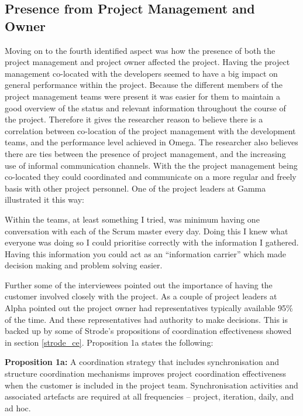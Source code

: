 \subsection{Presence from Project Management and Owner}

Moving on to the fourth identified aspect was how the presence of both the project management and project owner affected the project. Having the project management co-located with the developers seemed to have a big impact on general performance within the project. Because the different members of the project management teams were present it was easier for them to maintain a good overview of the status and relevant information throughout the course of the project. Therefore it gives the researcher reason to believe there is a correlation between co-location of the project management with the development teams, and the performance level achieved in Omega. The researcher also believes there are ties between the presence of project management, and the increasing use of informal communication channels. With the the project management being co-located they could coordinated and communicate on a more regular and freely basis with other project personnel. One of the project leaders at Gamma illustrated it this way:

\begin{fancyquotes}
Within the teams, at least something I tried, was minimum having one conversation with each of the Scrum master every day. Doing this I knew what everyone was doing so I could prioritise correctly with the information I gathered. Having this information you could act as an ``information carrier'' which made decision making and problem solving easier.
\end{fancyquotes}

Further some of the interviewees pointed out the importance of having the customer involved closely with the project. As a couple of project leaders at Alpha pointed out the project owner had representatives typically available 95\% of the time. And these representatives had authority to make decisions. This is backed up by some of Strode's \cite{Strode2012} propositions of coordination effectiveness showed in section \ref{strode_ce}. Proposition 1a states the following:

\begin{fancyquotes}
\textbf{Proposition 1a:} A coordination strategy that includes synchronisation and structure coordination mechanisms improves project coordination effectiveness when the customer is included in the project team. Synchronisation activities and associated artefacts are required at all frequencies – project, iteration, daily, and ad hoc.
\end{fancyquotes}

